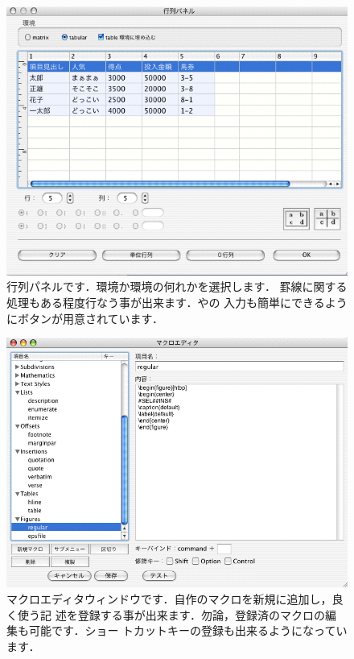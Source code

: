 \begin{figure}[htbp]
 \begin{center}
 \includegraphics[scale=.4]{images/TeXShop06} 
  \caption[\TeX Shop の行列パネル]{
  行列パネルです．環境か環境の何れかを選択します．
  罫線に関する処理もある程度行なう事が出来ます．やの
  入力も簡単にできるようにボタンが用意されています．}
 \end{center}
\end{figure}

\begin{figure}[htbp]
 \begin{center}
 \includegraphics[scale=.4]{images/TeXShop07} 
 \caption[\TeX Shop のマクロエディタウィンドウ]{
  マクロエディタウィンドウです．自作のマクロを新規に追加し，良く使う記
  述を登録する事が出来ます．勿論，登録済のマクロの編集も可能です．ショー
  トカットキーの登録も出来るようになっています．}
 \end{center}
\end{figure}

